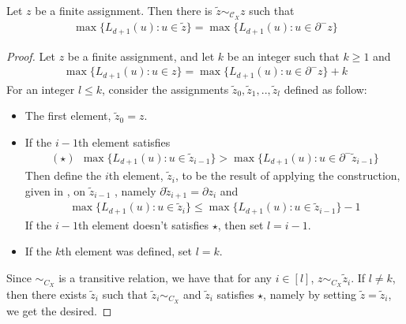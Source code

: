 \begin{claim}
  \label{claim:extermum}
  Let $z$ be a finite assignment. Then there is $\tilde{z} \sim_{\mathcal{C}_{X}} z$ such that 
  \begin{equation*}
    \begin{split}
      \max \big\{ L_{d+1}(u) :  u \in \tilde{z} \big\} = \max \big\{ L_{d+1}(u) : u \in \partial^{-} z \big\}
    \end{split}
  \end{equation*}
\end{claim}
\begin{proof}
Let $z$ be a finite assignment, and let $k$ be an integer such that $k \ge 1$ and
  \begin{equation*}
    \begin{split}
            \max \big\{ L_{d+1}(u) :  u \in z \big\} =  \max \big\{ L_{d+1}(u) : u \in \partial^{-} z \big\} + k
    \end{split}
  \end{equation*}
  For an integer $l \le k$, consider the assignments $\tilde{z}_{0},\tilde{z}_{1},..,\tilde{z}_{l}$ defined as follow: 
  \begin{itemize}
    \item The first element, $\tilde{z}_{0} = z$. 
    \item If the $i-1$th element satisfies 
  \begin{equation*}
    \begin{split}
      (\star ) \ \ \max \big\{ L_{d+1}(u) :  u \in \tilde{z}_{i-1} \big\} > \max \big\{ L_{d+1}(u) : u \in \partial^{-} \tilde{z}_{i-1} \big\} 
    \end{split}
  \end{equation*}
      Then define the $i$th element, $\tilde{z}_{i}$, to be the result of applying the construction, given in , on $\tilde{z}_{i-1}$ , namely  $\partial \tilde{z}_{i+1} = \partial z_{i}$ and  
\begin{equation*}
  \begin{split}
    \max \big\{ L_{d+1}(u) :  u \in \tilde{z}_{i} \big\} \le  \max \big\{ L_{d+1}(u) : u \in \tilde{z}_{i-1} \big\} - 1
  \end{split}
\end{equation*}
If the $i-1$th element doesn't satisfies $\star$, then set $l = i -1$.
\item If the $k$th element was defined, set $l = k$.
  \end{itemize}
Since $\sim_{C_{X}}$ is a transitive relation, we have that for any $i \in [l]$, $z \sim_{C_{X}} \tilde{z}_{i}$. If $l \neq k$, then there exists $\tilde{z}_{i}$ such that $\tilde{z}_{i} \sim_{C_{X}}$ and $\tilde{z}_{i}$ satisfies $\star$, namely by setting $\tilde{z} = \tilde{z}_{i}$, we get the desired.

\end{proof}
